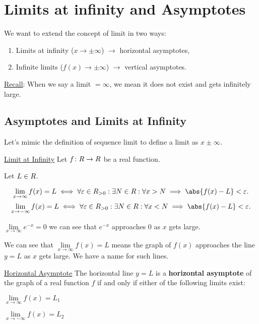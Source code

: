 \section{Limits at infinity and Asymptotes}
We want to extend the concept of limit in two ways:
\begin{enumerate}[(1)]
    \item Limits at infinity ($ x\to\pm\infty $) $ \to $ horizontal asymptotes,
    \item Infinite limits ($ f(x)\to\pm\infty $) $ \to $ vertical asymptotes.
\end{enumerate}
\underline{Recall}: When we say a limit $ =\infty $, we mean it does not exist and gets infinitely large.
\subsection{Asymptotes and Limits at Infinity}
Let's mimic the definition of sequence limit to define a limit as $ x\pm\infty $.
\begin{Definition}{\href{https://proofwiki.org/wiki/Definition:Limit\_of_Real\_Function/Limit\_at\_Infinity}{Limit at Infinity}}{}
    Let $ f\colon\relax{R}\to\relax{R} $ be a real function.\smallskip

    Let $ L\in\relax{R} $.

    \[ \lim\limits_{{x} \to {\infty}}f(x)=L\iff
        \forall \varepsilon\in\R_{>0}:\exists N\in\R:\forall x>N\implies \abs{f(x)-L}<\varepsilon. \]
    \[ \lim\limits_{{x} \to {-\infty}}f(x)=L\iff
        \forall \varepsilon\in\R_{>0}:\exists N\in\R:\forall x<N\implies \abs{f(x)-L}<\varepsilon. \]
\end{Definition}
\begin{Example}{}{}
    $\lim\limits_{{x} \to {\infty}}e^{-x}=0$ we can see that $ e^{-x} $ approaches $ 0 $
    as $ x $ gets large.
\end{Example}
We can see that $ \lim\limits_{{x} \to {\infty}}f(x)=L $ means the graph of $ f(x) $ approaches
the line $ y=L $ as $ x $ gets large. We have a name for such lines.
\begin{Definition}{\href{https://proofwiki.org/wiki/Definition:Horizontal\_Asymptote}{Horizontal Asymptote}}{}
    The horizontal line $ y=L $ is a \textbf{horizontal asymptote} of the graph of a real function $ f $
    if and only if either of the following limits exist:
    \begin{description}
        \item $ \lim\limits_{{x} \to {\infty}}f(x)=L_1 $
        \item $ \lim\limits_{{x} \to {-\infty}}f(x)=L_2 $
    \end{description}
\end{Definition}
